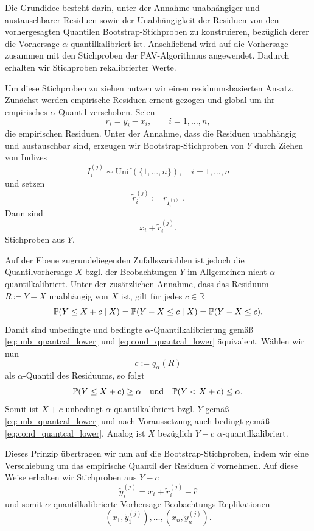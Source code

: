 Die Grundidee besteht darin, unter der Annahme unabhängiger und austauschbarer Residuen sowie der Unabhängigkeit der Residuen von den vorhergesagten Quantilen Bootstrap-Stichproben zu konstruieren, bezüglich derer die Vorhersage $\alpha$-quantilkalibriert ist. Anschließend wird auf die Vorhersage zusammen mit den Stichproben der PAV-Algorithmus angewendet. Dadurch erhalten wir Stichproben rekalibrierter Werte.

Um diese Stichproben zu ziehen nutzen wir einen residuumsbasierten Ansatz. Zunächst werden empirische Residuen erneut gezogen und global um ihr empirisches $\alpha$-Quantil verschoben.
Seien
\[
r_i = y_i - x_i, \qquad i=1,\dots,n,
\]
die empirischen Residuen. Unter der Annahme, dass die Residuen unabhängig und austauschbar sind, erzeugen wir Bootstrap-Stichproben von $Y$ durch Ziehen von Indizes
\[
I_i^{(j)} \sim \mathrm{Unif}(\{1,\dots,n\}),\quad i=1,\dots,n
\]
und setzen
\[
\tilde r_i^{(j)} := r_{I_i^{(j)}}\;.
\]
Dann sind
\[
    x_i + \tilde r_i^{(j)}.
\]
Stichproben aus $Y$. 

Auf der Ebene zugrundeliegenden Zufallsvariablen ist jedoch die Quantilvorhersage $X$ bzgl. der Beobachtungen $Y$ im Allgemeinen nicht $\alpha$-quantilkalibriert. Unter der zusätzlichen Annahme, dass das Residuum $R\coloneqq Y-X$ unabhängig von $X$ ist, gilt für jedes $c\in\mathbb R$
\[
\mathbb{P}(Y \le X+c \mid X) = \mathbb{P}(Y-X \le c \mid X) = \mathbb{P}(Y-X \le c).
\]
Damit sind unbedingte und bedingte $\alpha$-Quantilkalibrierung gemäß \eqref{eq:unb_quantcal_lower} und \eqref{eq:cond_quantcal_lower} äquivalent.
Wählen wir nun
\[
    c := q_\alpha(R)
\]
als $\alpha$-Quantil des Residuums, so folgt
\[
    \mathbb{P}(Y \le X+c)\ge \alpha \quad\text{und} \quad \mathbb{P}(Y < X+c)\le \alpha.
\]
Somit ist $X+c$ unbedingt $\alpha$-quantilkalibriert bzgl. $Y$ gemäß \eqref{eq:unb_quantcal_lower} und nach Voraussetzung auch bedingt gemäß \eqref{eq:cond_quantcal_lower}. Analog ist $X$ bezüglich $Y-c$ $\alpha$-quantilkalibriert.

Dieses Prinzip übertragen wir nun auf die Bootstrap-Stichproben, indem wir eine Verschiebung um das empirische Quantil der Residuen $\hat c$ vornehmen. Auf diese Weise erhalten wir Stichproben aus $Y-c$
\[
    \tilde y_i^{(j)} = x_i + \tilde r_i^{(j)} - \hat c
\]
und somit $\alpha$-quantilkalibrierte Vorhersage-Beobachtungs Replikationen
\[
(x_1,\tilde y_1^{(j)}),\dotsc,(x_n,\tilde y_n^{(j)}).
\]

